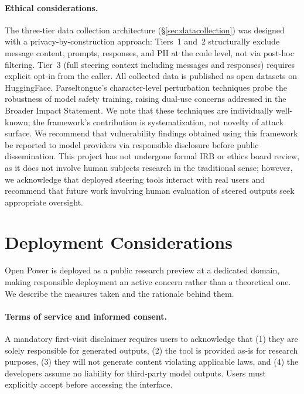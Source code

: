 \documentclass[11pt]{article}
\begin{document}
\paragraph{Ethical considerations.}
The three-tier data collection architecture (\S\ref{sec:datacollection}) was designed with a privacy-by-construction approach: Tiers~1 and~2 structurally exclude message content, prompts, responses, and PII at the code level, not via post-hoc filtering. Tier~3 (full steering context including messages and responses) requires explicit opt-in from the caller. All collected data is published as open datasets on HuggingFace.
Parseltongue's character-level perturbation techniques probe the robustness of model safety training, raising dual-use concerns addressed in the Broader Impact Statement. We note that these techniques are individually well-known; the framework's contribution is systematization, not novelty of attack surface.
We recommend that vulnerability findings obtained using this framework be reported to model providers via responsible disclosure before public dissemination. This project has not undergone formal IRB or ethics board review, as it does not involve human subjects research in the traditional sense; however, we acknowledge that deployed steering tools interact with real users and recommend that future work involving human evaluation of steered outputs seek appropriate oversight.

\section{Deployment Considerations}
\label{sec:deployment}

Open Power is deployed as a public research preview at a dedicated domain, making responsible deployment an active concern rather than a theoretical one. We describe the measures taken and the rationale behind them.

\paragraph{Terms of service and informed consent.} A mandatory first-visit disclaimer requires users to acknowledge that (1) they are solely responsible for generated outputs, (2) the tool is provided as-is for research purposes, (3) they will not generate content violating applicable laws, and (4) the developers assume no liability for third-party model outputs. Users must explicitly accept before accessing the interface.
\end{document}
